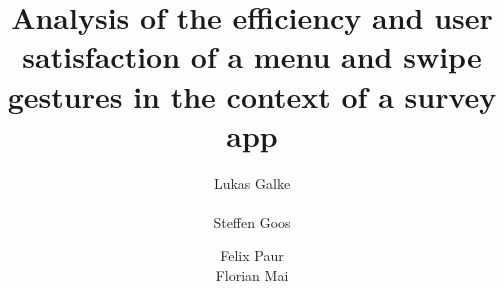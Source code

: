 \documentclass{sig-alternate-05-2015}
\begin{document}
%
\title{Analysis of the efficiency and user satisfaction of a menu and swipe gestures in the context of a survey app}
%
%
%
%
%
\author{
  \alignauthor
  Lukas Galke\\
  \\
  \alignauthor Steffen Goos\\
  \and  %
  \alignauthor
  Felix Paur\\
  \alignauthor
  Florian Mai\\
}
\end{document}
